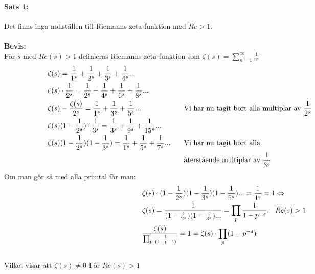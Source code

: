 \documentclass{article}%
\def \width {3mm}
\begin{document}
\paragraph{Sats 1:}
Det finns inga nollställen till Riemanns zeta-funktion med $Re > 1$.\\
\\
{\bf Bevis:} \\
För $s$ med $Re(s) > 1$ definieras Riemanns zeta-funktion som 
$\zeta(s) = \sum\limits_{n = 1}^\infty \frac {1} {n^s}$ 
\begin{equation}
	\begin{aligned}
		&\zeta(s) = \frac 1 {1^s} + \frac 1 {2^s} + \frac 1 {3^s} + \frac 1 {4^s} ... \notag\\
		&\zeta(s) \cdot \frac 1 {2^s} = \frac 1 {2^s} + \frac 1 {4^s} + \frac 1 {6^s} + \frac 1 {8^s} ... \\
		&\zeta(s) - \frac {\zeta(s)} {2^s} = \frac 1 {1^s} + \frac 1 {3^s} + \frac 1 {5^s} ... &
		\hspace{\width} &\text{Vi har nu tagit bort alla multiplar av } \frac 1 {2^s} \\
		&\zeta(s) (1 - \frac 1 {2^s}) \cdot \frac 1 {3^s} = \frac 1 {3^s} + \frac 1 {9^s} + \frac 1 {15^s} ...\\
		&\zeta(s)(1 - \frac 1 {2^s})(1 - \frac 1 {3^s}) = \frac 1 {1^s} + \frac 1 {5^s} + \frac 1 {7^s} ... &
		\hspace{\width} &\text{Vi har nu tagit bort alla} \\
		& & \hspace{\width} &\text{återstående multiplar av } \frac 1 {3^s} \\
	\end{aligned}
	\phantom{\hspace{4cm}}
\end{equation}
Om man gör så med alla primtal får man: 
\begin{equation}
	\begin{aligned}
		\notag
		&\zeta(s) \cdot (1 - \frac 1 {2^s})(1 - \frac 1 {3^s})(1 - \frac 1 {5^s}) ... = \frac 1 {1^s} = 1 \Leftrightarrow \\  
		&\zeta(s)  = \frac 1 {(1 - \frac 1 {2^s})(1 - \frac 1 {3^s})...} = \prod_p \frac 1 {1 - p^{-s}}.\hspace{\width} Re(s) > 1 \\
		&\frac {\zeta(s)} {\prod_p \frac 1 {(1 - p^{-s})}} = 1 = \zeta(s) \cdot \prod_p (1 - p^{-s}) \\
	\end{aligned}
\end{equation}
\\
Vilket visar att $\zeta(s) \ne 0 \text{ För } Re(s) > 1$
\end{document}
